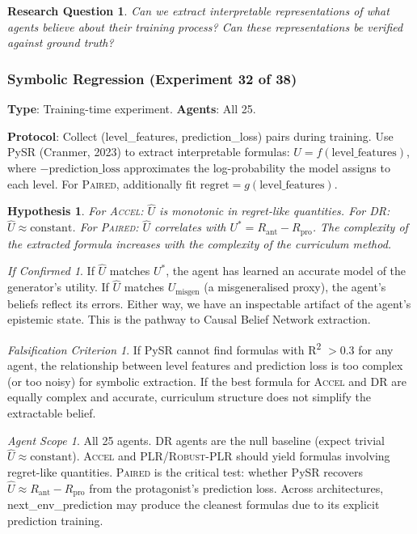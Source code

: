 \documentclass[11pt,a4paper]{article}
\newtheorem{hypothesis}{Hypothesis}[subsection]
\newtheorem{researchq}{Research Question}[subsection]
\theoremstyle{remark}
\newtheorem*{falsification}{Falsification Criterion}
\newtheorem*{implication}{If Confirmed}
\newtheorem*{agentscope}{Agent Scope}
\newcommand{\paired}{\textsc{Paired}}
\newcommand{\accel}{\textsc{Accel}}
\newcommand{\plr}{\textsc{PLR}}
\newcommand{\dr}{\textsc{DR}}
\newcommand{\rplr}{\textsc{Robust-PLR}}
\newcommand{\Uhat}{\hat{U}}
\newcommand{\Ustar}{U^*}
\newcommand{\Umisgen}{U_{\text{misgen}}}
\newcommand{\Rpro}{R_{\text{pro}}}
\newcommand{\Rant}{R_{\text{ant}}}
\begin{document}
\begin{researchq}
Can we extract interpretable representations of what agents believe about their training process? Can these representations be verified against ground truth?
\end{researchq}

\subsubsection{Symbolic Regression (Experiment 32 of 38)}
\label{exp:symbolic_regression}

\textbf{Type}: Training-time experiment. \textbf{Agents}: All 25.

\textbf{Protocol}: Collect (level\_features, prediction\_loss) pairs during training. Use PySR (Cranmer, 2023) to extract interpretable formulas: $\Uhat = f(\text{level\_features})$, where $-\text{prediction\_loss}$ approximates the log-probability the model assigns to each level. For \paired{}, additionally fit $\text{regret} = g(\text{level\_features})$.

\begin{hypothesis}
For \accel{}: $\Uhat$ is monotonic in regret-like quantities. For \dr{}: $\Uhat \approx \text{constant}$. For \paired{}: $\Uhat$ correlates with $\Ustar = \Rant - \Rpro$. The complexity of the extracted formula increases with the complexity of the curriculum method.
\end{hypothesis}

\begin{implication}
If $\Uhat$ matches $\Ustar$, the agent has learned an accurate model of the generator's utility. If $\Uhat$ matches $\Umisgen$ (a misgeneralised proxy), the agent's beliefs reflect its errors. Either way, we have an inspectable artifact of the agent's epistemic state. This is the pathway to Causal Belief Network extraction.
\end{implication}

\begin{falsification}
If PySR cannot find formulas with R\textsuperscript{2} $> 0.3$ for any agent, the relationship between level features and prediction loss is too complex (or too noisy) for symbolic extraction. If the best formula for \accel{} and \dr{} are equally complex and accurate, curriculum structure does not simplify the extractable belief.
\end{falsification}

\begin{agentscope}
All 25 agents. \dr{} agents are the null baseline (expect trivial $\Uhat \approx \text{constant}$). \accel{} and \plr{}/\rplr{} should yield formulas involving regret-like quantities. \paired{} is the critical test: whether PySR recovers $\Uhat \approx \Rant - \Rpro$ from the protagonist's prediction loss. Across architectures, next\_env\_prediction may produce the cleanest formulas due to its explicit prediction training.
\end{agentscope}
\end{document}
